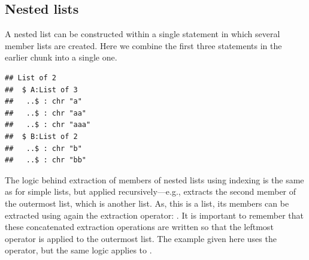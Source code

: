\documentclass[krantz2]{krantz}\usepackage{knitr}
\begin{document}
\subsection{Nested lists}
A nested list can be constructed within a single statement in which several member lists are created. Here we combine the first three statements in the earlier chunk into a single one.

\begin{knitrout}\footnotesize
{}\color{fgcolor}\begin{kframe}
\begin{alltt}
 \hlkwb{<-} \hlstd{(} \hlstd{=} \hlstd{(}\hlstd{,} \hlstd{,} \hlstd{),}  \hlstd{=} \hlstd{(}\hlstd{,} \hlstd{))}
\end{alltt}
\begin{verbatim}
## List of 2
##  $ A:List of 3
##   ..$ : chr "a"
##   ..$ : chr "aa"
##   ..$ : chr "aaa"
##  $ B:List of 2
##   ..$ : chr "b"
##   ..$ : chr "bb"
\end{verbatim}
\end{kframe}
\end{knitrout}

\begin{explainbox}
The logic behind extraction of members of nested lists using indexing is the same as for simple lists, but applied recursively---e.g.,  extracts the second member of the outermost list, which is another list. As, this is a list, its members can be extracted using again the extraction operator: . It is important to remember that these concatenated extraction operations are written so that the leftmost operator is applied to the outermost list. The example given here uses the \Roperator{[[ ]]} operator, but the same logic applies to \Roperator{[ ]}.
\end{explainbox}
\end{document}
